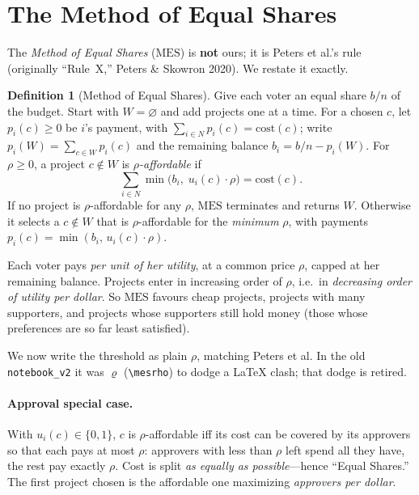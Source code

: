 \documentclass[11pt,letterpaper]{article}
\theoremstyle{definition}
\newtheorem{definition}{Definition}[section]
\theoremstyle{plain}
\theoremstyle{remark}
\newcommand{\voters}{N}            %
\newcommand{\budget}{b}            %
\newcommand{\cost}{\mathrm{cost}}  %
\newcommand{\MES}{\mathrm{MES}}
\begin{document}
\section{The Method of Equal Shares}
\label{sec:mes}

\begin{naming}
The \emph{Method of Equal Shares} ($\MES$) is \textbf{not} ours; it is Peters et al.'s rule
(originally ``Rule~X,'' Peters \& Skowron 2020). We restate it exactly.
\end{naming}

\begin{definition}[Method of Equal Shares]
\label{def:mes}
Give each voter an equal share $\budget/n$ of the budget. Start with $W=\varnothing$ and add
projects one at a time. For a chosen $c$, let $p_i(c)\ge 0$ be $i$'s payment, with
$\sum_{i\in \voters}p_i(c)=\cost(c)$; write $p_i(W)=\sum_{c\in W}p_i(c)$ and the remaining balance
$b_i=\budget/n-p_i(W)$. For $\rho\ge 0$, a project $c\notin W$ is \emph{$\rho$-affordable} if
\[
  \sum_{i\in \voters}\min\bigl(b_i,\; u_i(c)\cdot \rho\bigr)=\cost(c).
\]
If no project is $\rho$-affordable for any $\rho$, $\MES$ terminates and returns $W$. Otherwise it
selects a $c\notin W$ that is $\rho$-affordable for the \emph{minimum} $\rho$, with payments
$p_i(c)=\min(b_i,\,u_i(c)\cdot\rho)$.
\end{definition}

\begin{keyidea}
Each voter pays \emph{per unit of her utility}, at a common price $\rho$, capped at her remaining
balance. Projects enter in increasing order of $\rho$, i.e.\ in \emph{decreasing order of utility
per dollar}. So $\MES$ favours cheap projects, projects with many supporters, and projects whose
supporters still hold money (those whose preferences are so far least satisfied).
\end{keyidea}

\begin{watchout}
We now write the threshold as plain $\rho$, matching Peters et al. In the old \texttt{notebook\_v2}
it was $\varrho$ (\texttt{\textbackslash mesrho}) to dodge a LaTeX clash; that dodge is retired.
\end{watchout}

\paragraph{Approval special case.} With $u_i(c)\in\{0,1\}$, $c$ is $\rho$-affordable iff its cost
can be covered by its approvers so that each pays at most $\rho$: approvers with less than $\rho$
left spend all they have, the rest pay exactly $\rho$. Cost is split \emph{as equally as
possible}---hence ``Equal Shares.'' The first project chosen is the affordable one maximizing
\emph{approvers per dollar}.
\end{document}
